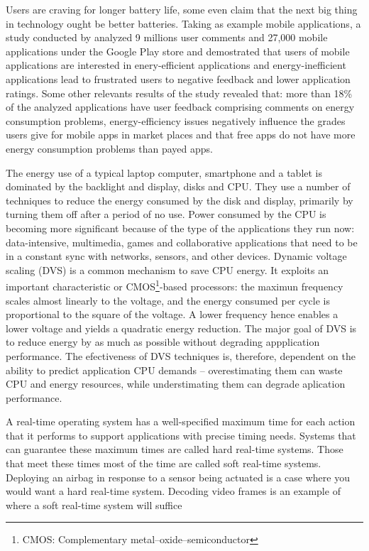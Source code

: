 \documentclass[10pt,article]{IEEEtran}
\begin{document}
Users are craving for longer battery life, some even claim that the next big thing in technology ought be better batteries\cite{moren}. Taking as example mobile applications, a study conducted by \cite{wilke-et-al} analyzed 9 millions user comments and 27,000 mobile applications under the Google Play store and demostrated that users of mobile applications are interested in enery-efficient applications and energy-inefficient applications lead to frustrated users to negative feedback and lower application ratings. Some other relevants results of the study revealed that: more than 18\% of the analyzed applications have user feedback comprising comments on energy consumption problems, energy-efficiency issues negatively influence the grades users give for mobile apps in market places and that free apps do not have more energy consumption problems than payed apps. 

The energy use of a typical laptop computer, smartphone and a tablet is dominated by the backlight and display, disks and CPU. They use a number of techniques to reduce the energy consumed by the disk and display, primarily by turning them off after a period of no use. Power consumed by the CPU is becoming more significant because of the type of the applications they run now: data-intensive, multimedia, games and collaborative applications that need to be in a constant sync with networks, sensors, and other devices. Dynamic voltage scaling (DVS) is a common mechanism to save CPU energy. It exploits an important characteristic or CMOS\footnote{CMOS: Complementary metal–oxide–semiconductor}-based processors: the maximun frequency scales almost linearly to the voltage, and the energy consumed per cycle is proportional to the square of the voltage. A lower frequency hence enables a lower voltage and yields a quadratic energy reduction\cite{chandrakasan}. The major goal of DVS is to reduce energy by as much as possible without degrading appplication performance. The efectiveness of DVS techniques is, therefore, dependent on the ability to predict application CPU demands -- overestimating them can waste CPU and energy resources, while understimating them can degrade aplication performance\cite{yuan-nahrstedt}.

A real-time operating system has a well-specified maximum time for each action that it performs to support applications with precise timing needs. Systems that can guarantee these maximum times are called hard real-time systems. Those that meet these times most of the time are called soft real-time systems. Deploying an airbag in response to a sensor being actuated is a case where you would want a hard real-time system. Decoding video frames is an example of where a soft real-time system will suffice
\end{document}
